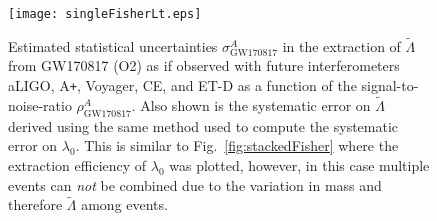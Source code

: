 \documentclass[prd,twocolumn,nofootinbib,superscriptaddress,amsmath,amssymb]{revtex4-1}
\begin{document}
\begin{figure}
\begin{center} 
\texttt{[image: singleFisherLt.eps]}
\end{center}
\caption{
Estimated statistical uncertainties $\sigma^A_{\text{GW170817}}$ in the extraction of $\tilde\Lambda$ from GW170817 (O2) as if observed with future interferometers aLIGO, A\texttt{+}, Voyager, CE, and ET-D as a function of the signal-to-noise-ratio $\rho^A_{\text{GW170817}}$.
Also shown is the systematic error on $\tilde\Lambda$ derived using the same method used to compute the systematic error on $\lambda_0$.
This is similar to Fig.~\ref{fig:stackedFisher} where the extraction efficiency of $\lambda_0$ was plotted, however, in this case multiple events can \emph{not} be combined due to the variation in mass and therefore $\tilde\Lambda$ among events.
}
\label{fig:singleFisherLt}
\end{figure} 
\end{document}
